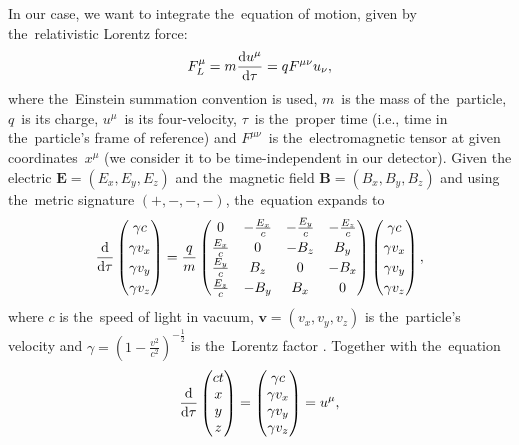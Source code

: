 		In our case, we want to integrate the~equation of motion, given by the~relativistic Lorentz force:
			\begin{equation}
				F^\mu_L = m\derivative{u^\mu}{\tau} = q F^{\mu\nu}u_{\nu},
			\end{equation}
		where the~Einstein summation convention is used, $m$~is the mass of the~particle, $q$~is its charge, $u^\mu$~is its four-velocity, $\tau$~is the~proper time (i.e., time in the~particle's frame of reference) and $F^{\mu\nu}$~is the~electromagnetic tensor at given coordinates~$x^\mu$ (we consider it to be time-independent in our detector). Given the electric $\mathbf{E} = (E_x,E_y,E_z)$ and the~magnetic field $\mathbf{B} = (B_x,B_y,B_z)$ and using the~metric signature $(+,-,-,-)$, the~equation expands to
			\begin{equation}
				\renewcommand{\arraystretch}{1.2}
				\derivative{}{\tau} \begin{pmatrix}\gamma c\\ \gamma v_x\\ \gamma v_y\\ \gamma v_z\end{pmatrix} = \frac{q}{m} 
				\begin{pmatrix}
					0             & -\frac{E_x}{c} & -\frac{E_y}{c} & -\frac{E_z}{c} \\
					\frac{E_x}{c} &  0             & -B_z           &  B_y           \\
					\frac{E_y}{c} &  B_z           &  0             & -B_x           \\
					\frac{E_z}{c} & -B_y           &  B_x           &  0
				\end{pmatrix}
				\begin{pmatrix}\gamma c\\ \gamma v_x\\ \gamma v_y\\ \gamma v_z\end{pmatrix},
				\renewcommand{\arraystretch}{1}
			\end{equation}
		where $c$ is the~speed of light in vacuum, $\mathbf{v} = (v_x,v_y,v_z)$ is the~particle's velocity and $\gamma = \left(1-\frac{v^2}{c^2}\right)^{-\frac{1}{2}}$ is the~Lorentz factor . Together with the~equation
			\begin{equation}
				\derivative{}{\tau} \begin{pmatrix} ct\\ x\\ y\\ z\end{pmatrix} = \begin{pmatrix}\gamma c\\ \gamma v_x\\ \gamma v_y\\ \gamma v_z\end{pmatrix} = u^\mu,
			\end{equation}
